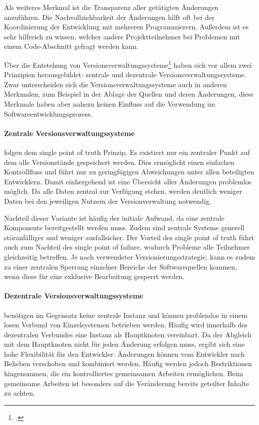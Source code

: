 Als weiteres Merkmal ist die Transparenz aller getätigten Änderungen anzuführen. Die Nachvollziehbarkeit der Änderungen 
hilft oft bei der Koordinierung der Entwicklung mit mehreren Programmierern. Außerdem ist es sehr hilfreich zu wissen, 
welcher andere Projektteilnehmer bei Problemen mit einem Code-Abschnitt gefragt werden kann. 

Über die Entstehung von Versionsverwaltungssysteme\footcite[vgl.][S.417]{software-quality2008} haben sich vor allem zwei Prinzipien herausgebildet: 
zentrale und dezentrale Versionsverwaltungssysteme. Zwar unterscheiden sich die Versionsverwaltungssysteme auch in 
anderen Merkmalen, zum Beispiel in der Ablage der Quellen und deren Änderungen, diese Merkmale haben aber nahezu keinen 
Einfluss auf die Verwendung im Softwareentwicklungsprozess.

\paragraph{Zentrale Versionsverwaltungssysteme} folgen dem \glqq single point of truth\grqq{} Prinzip. Es existiert nur ein
zentraler Punkt auf dem alle Versionstände gespeichert werden. Dies ermöglicht einen einfachen Kontrollfluss und führt nur zu geringfügigen Abweichungen unter allen beteiligten Entwicklern. Damit einhergehend ist eine Übersicht aller Änderungen problemlos möglich. 
Da alle Daten zentral zur Verfügung stehen, werden deutlich weniger Daten bei den jeweiligen Nutzern der Versionverwaltung notwendig.

Nachteil dieser Variante ist häufig der initiale Aufwand, da eine zentrale Komponente bereitgestellt werden muss. Zudem 
sind zentrale Systeme generell störanfälliger und weniger ausfallsicher. Der Vorteil des \glqq single point of truth\grqq{} führt
auch zum Nachteil des \glqq single point of failure\grqq{}, wodurch Probleme alle Teilnehmer gleichzeitig betreffen.
Je nach verwendeter Versionierungsstrategie, kann es zudem zu einer zentralen Sperrung einzelner Bereiche der Softwarequellen kommen, wenn diese für eine exklusive Bearbeitung gesperrt werden.

\paragraph{Dezentrale Versionsverwaltungssysteme} benötigen im Gegensatz keine zentrale Instanz und können problemlos in einem losen Verbund von Einzelsystemen betrieben werden. 
Häufig wird innerhalb des dezentralen Verbundes eine Instanz als Hauptknoten vereinbart. Da der Abgleich mit dem Hauptknoten nicht für jeden Änderung erfolgen muss, ergibt sich eine hohe Flexibilität für den Entwickler. Änderungen können vom Entwickler nach Belieben verschoben und kombiniert werden.
Häufig werden jedoch Restriktionen hingenommen, die ein kontrolliertes gemeinsamen Arbeiten ermöglichen. Beim gemeinsame Arbeiten ist besonders auf die Veränderung bereits geteilter Inhalte zu achten.
 
